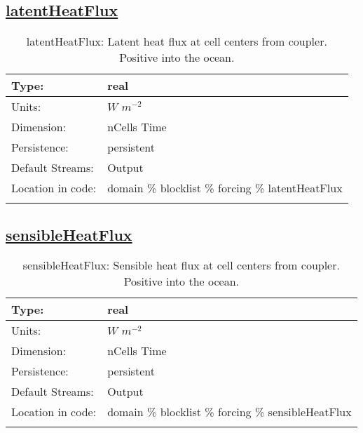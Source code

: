 \subsection[latentHeatFlux]{\hyperref[sec:var_tab_forcing]{latentHeatFlux}}
\label{subsec:var_sec_forcing_latentHeatFlux}
\begin{center}
\begin{longtable}{| p{2.0in} | p{4.0in} |}
        \hline 
        Type: & real \\
        \hline 
        Units: & $W$ $m^{-2}$ \\
        \hline 
        Dimension: & nCells Time \\
        \hline 
        Persistence: & persistent \\
        \hline 
		 Default Streams: & Output  \\
        \hline 
		 Location in code: & domain \% blocklist \% forcing \% latentHeatFlux \\
		 \hline 
    \caption{latentHeatFlux: Latent heat flux at cell centers from coupler. Positive into the ocean.}
\end{longtable}
\end{center}
\subsection[sensibleHeatFlux]{\hyperref[sec:var_tab_forcing]{sensibleHeatFlux}}
\label{subsec:var_sec_forcing_sensibleHeatFlux}
\begin{center}
\begin{longtable}{| p{2.0in} | p{4.0in} |}
        \hline 
        Type: & real \\
        \hline 
        Units: & $W$ $m^{-2}$ \\
        \hline 
        Dimension: & nCells Time \\
        \hline 
        Persistence: & persistent \\
        \hline 
		 Default Streams: & Output  \\
        \hline 
		 Location in code: & domain \% blocklist \% forcing \% sensibleHeatFlux \\
		 \hline 
    \caption{sensibleHeatFlux: Sensible heat flux at cell centers from coupler. Positive into the ocean.}
\end{longtable}
\end{center}
